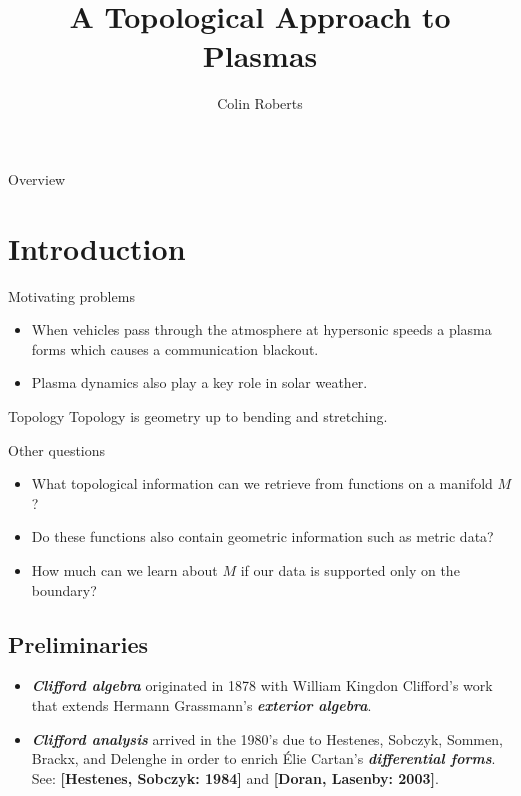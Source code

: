 \documentclass[aspectratio=169]{beamer}
\author{Colin Roberts}
\title{A Topological Approach to Plasmas}
\subtitle{}
\newcommand\boldgreen[1]{\textcolor{lighter_csu_green}{\emph{\textbf{#1}}}}
\newcommand\boldgold[1]{\textcolor{csu_gold}{\textbf{#1}}}
\begin{document}
\begin{frame}{Overview}
\tableofcontents
\end{frame}

\section{Introduction}

\begin{frame}{Motivating problems}
\vfill
\begin{itemize}
\pause
\item When vehicles pass through the atmosphere at hypersonic speeds a plasma forms which causes a communication blackout.
\pause
\item Plasma dynamics also play a key role in solar weather.
\end{itemize}
\vfill
\end{frame}

\begin{frame}{Topology}
Topology is geometry up to bending and stretching.
\end{frame}

\begin{frame}{Other questions}
\vfill 
    \begin{itemize}
        \pause 
        \item What topological information can we retrieve from functions on a manifold $M$?

        \pause
        \item Do these functions also contain geometric information such as metric data?

        \pause
        \item How much can we learn about $M$ if our data is supported only on the boundary?
    \end{itemize}
\vfill
\end{frame}

\subsection{Preliminaries}

\begin{frame}{}
\vfill
\begin{itemize}
    \pause
    \item \boldgreen{Clifford algebra} originated in 1878 with William Kingdon Clifford's work that extends Hermann Grassmann's \boldgreen{exterior algebra}. 
    \pause
    \item \boldgreen{Clifford analysis} arrived in the 1980's due to Hestenes, Sobczyk, Sommen, Brackx, and Delenghe in order to enrich \'Elie Cartan's \boldgreen{differential forms}. See: \boldgold{[Hestenes, Sobczyk: 1984]} and \boldgold{[Doran, Lasenby: 2003]}.
\end{itemize}
\vfill
\end{frame}
\end{document}
